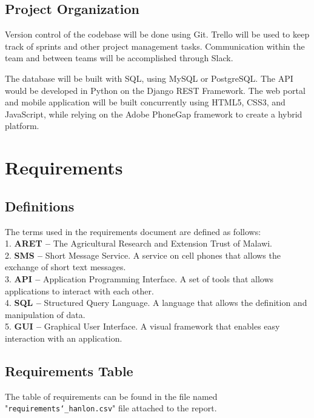 \documentclass[12pt,letterpaper]{article}
\begin{document}
\subsection{Project Organization}
Version control of the codebase will be done using Git. Trello will be used to keep track of sprints and other project management tasks. Communication within the team and between teams will be accomplished through Slack.\par
The database will be built with SQL, using MySQL or PostgreSQL. The API would be developed in Python on the Django REST Framework. The web portal and mobile application will be built concurrently using HTML5, CSS3, and JavaScript, while relying on the Adobe PhoneGap framework to create a hybrid platform.

\clearpage
\section{Requirements}
\subsection{Definitions}
The terms used in the requirements document are defined as follows:\\
1. \hspace*{5pt} \textbf{ARET -- } The Agricultural Research and Extension Trust of Malawi. \\
2. \hspace*{5pt} \textbf{SMS -- } Short Message Service. A service on cell phones that allows the exchange of short text messages.\\
3. \hspace*{5pt} \textbf{API -- } Application Programming Interface. A set of tools that allows applications to interact with each other.\\
4. \hspace*{5pt} \textbf{SQL -- } Structured Query Language. A language that allows the definition and manipulation of data.\\
5. \hspace*{5pt} \textbf{GUI -- } Graphical User Interface. A visual framework that enables easy interaction with an application.

\subsection{Requirements Table}
The table of requirements can be found in the file named "\texttt{requirements\char`_hanlon.csv}" file attached to the report.
\end{document}
